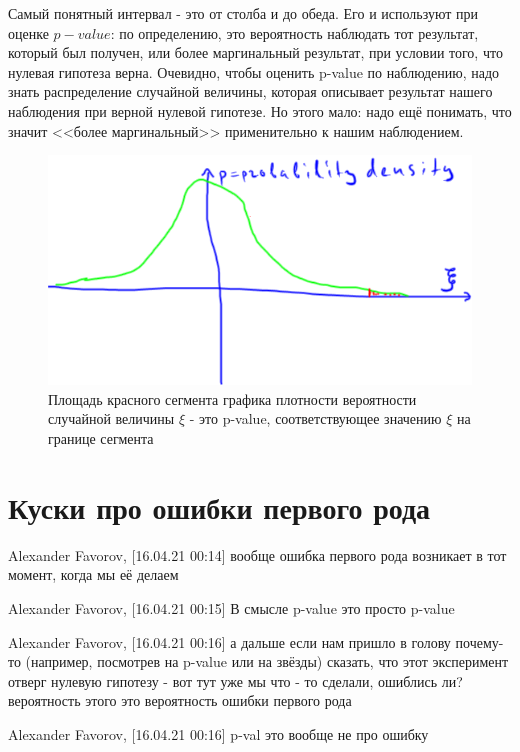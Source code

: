 \documentclass{book}
\begin{document}
Самый понятный интервал - это от столба и до обеда. Его и используют при оценке $p-value$: по определению, это вероятность наблюдать тот результат, который был получен, или более маргинальный результат, при условии того, что нулевая гипотеза верна. Очевидно, чтобы оценить p-value по наблюдению, надо знать распределение случайной величины, которая описывает результат нашего наблюдения при верной нулевой гипотезе. Но этого мало: надо ещё понимать, что значит <<более маргинальный>> применительно к нашим наблюдением. 


\begin{figure}
    \centering
    \includegraphics[scale=.5]{img/p-value.png}
    \caption{Площадь красного сегмента графика плотности вероятности случайной величины $\xi$ - это p-value, соответствующее значению $\xi$ на границе сегмента}
    \label{pval}
\end{figure}




\section*{Куски про ошибки первого рода}


Alexander Favorov, [16.04.21 00:14]
вообще ошибка первого рода возникает в тот момент, когда мы её делаем

Alexander Favorov, [16.04.21 00:15]
В смысле p-value это просто p-value

Alexander Favorov, [16.04.21 00:16]
а дальше если нам пришло в голову почему-то (например, посмотрев на p-value или на звёзды) сказать, что этот эксперимент отверг нулевую гипотезу - вот тут уже мы что - то сделали, ошиблись ли? вероятность этого это вероятность ошибки первого рода

Alexander Favorov, [16.04.21 00:16]
p-val это вообще не про ошибку
\end{document}
